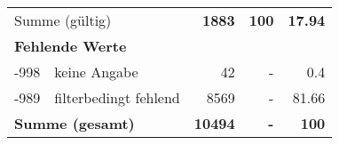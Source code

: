 \begin{longtable}{lXrrr}
     \midrule
     \multicolumn{2}{l}{Summe (gültig)} &
       \textbf{\num{1883}} &
     \textbf{\num{100}} &
       \textbf{\num[round-mode=places,round-precision=2]{17.94}} \\
     \multicolumn{5}{l}{\textbf{Fehlende Werte}}\\
       -998 &
       keine Angabe &
         \num{42} &
        - &
         \num[round-mode=places,round-precision=2]{0.4} \\
       -989 &
       filterbedingt fehlend &
         \num{8569} &
        - &
         \num[round-mode=places,round-precision=2]{81.66} \\
     \midrule
     \multicolumn{2}{l}{\textbf{Summe (gesamt)}} &
          \textbf{\num{10494}} &
        \textbf{-} &
        \textbf{\num{100}} \\
     \bottomrule
     \end{longtable}
     
